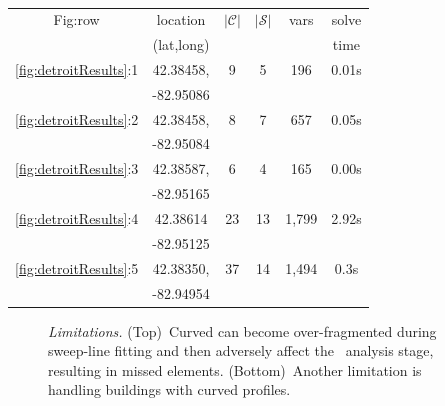  
\begin{table}[t!]
\begin{center}

\caption{ }
\label{table:runtimes1}
\begin{tabular}{|c|c|c|c|c|c|} 

\hline
 Fig:row & location & $|\mathcal{C}|$ & $|\mathcal{S}|$ & vars & solve\\
                    & (lat,long) &     &  &          & time \\
 \hline\hline
 \ref{fig:detroitResults}:1 & 42.38458, & 9 & 5 & 196 & 0.01s \\ 
   &-82.95086  &   &   &     &      \\  
 \ref{fig:detroitResults}:2 & 42.38458, & 8 & 7 & 657 & 0.05s \\
 &-82.95084  &   &   &     &        \\   
 \ref{fig:detroitResults}:3 & 42.38587, & 6 & 4 & 165 & 0.00s \\
 &-82.95165  &   &   &     &        \\   
 \ref{fig:detroitResults}:4 & 42.38614 & 23 & 13 & 1,799 & 2.92s \\
 &-82.95125  &   &   &     &        \\   
 \ref{fig:detroitResults}:5 & 42.38350, & 37 & 14 & 1,494 & 0.3s \\ 
 &-82.94954  &   &   &     &        \\  
 \hline
\end{tabular}
\end{center}
\end{table}


\begin{figure}[b]
    \centering
  \def\svgwidth{\linewidth}  
    
  \caption{{\it Limitations.} (Top)~Curved \facades can become over-fragmented during  
  sweep-line fitting and then adversely affect the \streetI\ analysis stage, resulting in missed \buildingfacade elements. 
  (Bottom)~Another limitation is handling buildings with curved profiles. }
  \label{fig:problems}
  \vnudge
\end{figure}

